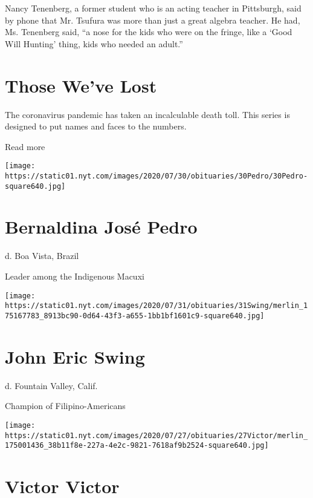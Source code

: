 Nancy Tenenberg, a former student who is an acting teacher in
Pittsburgh, said by phone that Mr. Tsufura was more than just a great
algebra teacher. He had, Ms. Tenenberg said, ``a nose for the kids who
were on the fringe, like a `Good Will Hunting' thing, kids who needed an
adult.''

\href{https://www.nytimes.com/interactive/2020/obituaries/people-died-coronavirus-obituaries.html?action=click\&pgtype=Article\&state=default\&region=BELOW_MAIN_CONTENT\&context=covid_obits_promo}{}

\hypertarget{those-weve-lost}{%
\section{Those We've Lost}\label{those-weve-lost}}

The coronavirus pandemic has taken an incalculable death toll. This
series is designed to put names and faces to the numbers.

Read more

\texttt{[image: https://static01.nyt.com/images/2020/07/30/obituaries/30Pedro/30Pedro-square640.jpg]}

\hypertarget{bernaldina-josuxe9-pedro}{%
\section{Bernaldina José Pedro}\label{bernaldina-josuxe9-pedro}}

d. Boa Vista, Brazil

Leader among the Indigenous Macuxi

\texttt{[image: https://static01.nyt.com/images/2020/07/31/obituaries/31Swing/merlin\_175167783\_8913bc90-0d64-43f3-a655-1bb1bf1601c9-square640.jpg]}

\hypertarget{john-eric-swing}{%
\section{John Eric Swing}\label{john-eric-swing}}

d. Fountain Valley, Calif.

Champion of Filipino-Americans

\texttt{[image: https://static01.nyt.com/images/2020/07/27/obituaries/27Victor/merlin\_175001436\_38b11f8e-227a-4e2c-9821-7618af9b2524-square640.jpg]}

\hypertarget{victor-victor}{%
\section{Victor Victor}\label{victor-victor}}

